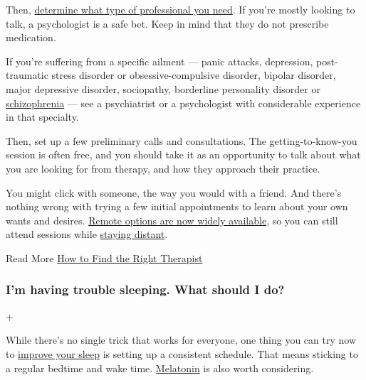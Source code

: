 Then,
\href{https://www.nytimes3xbfgragh.onion/2020/05/13/well/mind/prospective-therapist-interview-questions-online-virus.html}{determine
what type of professional you need}. If you're mostly looking to talk, a
psychologist is a safe bet. Keep in mind that they do not prescribe
medication.

If you're suffering from a specific ailment --- panic attacks,
depression, post-traumatic stress disorder or obsessive-compulsive
disorder, bipolar disorder, major depressive disorder, sociopathy,
borderline personality disorder or
\href{https://www.nytimes3xbfgragh.onion/2016/01/28/health/schizophrenia-cause-synaptic-pruning-brain-psychiatry.html}{schizophrenia}
--- see a psychiatrist or a psychologist with considerable experience in
that specialty.

Then, set up a few preliminary calls and consultations. The
getting-to-know-you session is often free, and you should take it as an
opportunity to talk about what you are looking for from therapy, and how
they approach their practice.

You might click with someone, the way you would with a friend. And
there's nothing wrong with trying a few initial appointments to learn
about your own wants and desires.
\href{https://www.nytimes3xbfgragh.onion/2020/05/13/well/mind/prospective-therapist-interview-questions-online-virus.html}{Remote
options are now widely available}, so you can still attend sessions
while
\href{https://www.nytimes3xbfgragh.onion/2020/07/09/well/mind/teletherapy-mental-health-coronavirus.html}{staying
distant}.

 Read More
\href{https://www.nytimes3xbfgragh.onion/2017/07/17/smarter-living/how-to-find-the-right-therapist.html}{How
to Find the Right Therapist}

\hypertarget{im-having-trouble-sleeping-what-should-i-do}{%
\subsubsection{I'm having trouble sleeping. What should I
do?}\label{im-having-trouble-sleeping-what-should-i-do}}

+

While there's no single trick that works for everyone, one thing you can
try now to
\href{https://www.nytimes3xbfgragh.onion/2020/03/25/style/self-care/sleep-tips-benefits-coronavirus.html}{improve
your sleep} is setting up a consistent schedule. That means sticking to
a regular bedtime and wake time.
\href{https://www.nytimes3xbfgragh.onion/2020/04/24/well/melatonin-sleep-aid-coronavirus.html}{Melatonin}
is also worth considering.


